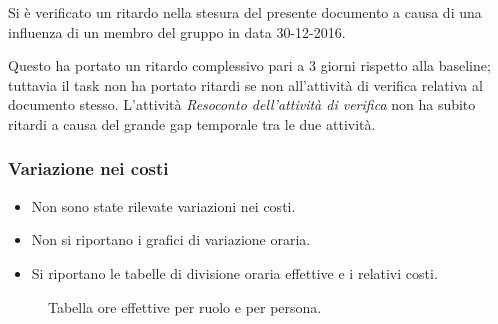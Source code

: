 Si è verificato un ritardo nella stesura del presente documento a causa di una influenza di un membro del gruppo in data 30-12-2016.

Questo ha portato un ritardo complessivo pari a 3 giorni rispetto alla baseline; tuttavia il task non ha portato ritardi se non all'attività di verifica relativa al documento stesso. L'attività \emph{Resoconto dell'attività di verifica} non ha subito ritardi a causa del grande gap temporale tra le due attività.

\pagebreak
\subsubsection{Variazione nei costi}
\begin{itemize}

\item Non sono state rilevate variazioni nei costi.

\item Non si riportano i grafici di variazione oraria.

\item Si riportano le tabelle di divisione oraria effettive e i relativi costi.

\end{itemize}
\begin{figure}[H]
\label{tab:car}
\caption{Tabella ore effettive {\AR} per ruolo e per persona.}

\end{figure}


